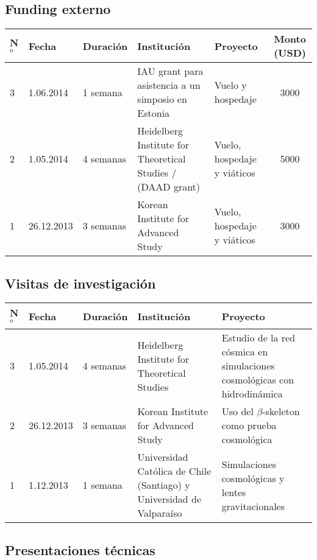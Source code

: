 \documentclass{article}
\begin{document}
\subsection{Funding externo}
\begin{tabular}{l l l p{3.5cm} p{2.3cm} c}\hline
N$^{o}$ & Fecha & Duraci\'on & Instituci\'on & Proyecto & Monto (USD)\\\hline
3 & 1.06.2014 & 1 semana & IAU grant para asistencia a un simposio en
Estonia & Vuelo y hospedaje & 3000\\\hline
2 & 1.05.2014 & 4 semanas & Heidelberg Institute for Theoretical
Studies / (DAAD grant) & Vuelo, hospedaje y vi\'aticos & 5000\\\hline
1 & 26.12.2013 & 3 semanas & Korean Institute for Advanced Study &
Vuelo, hospedaje y vi\'aticos & 3000\\\hline
\end{tabular}

\subsection{Visitas de investigaci\'on}

\begin{tabular}{l l l p{3.5cm} p{5.0cm}}\hline
N$^{o}$ & Fecha & Duraci\'on & Instituci\'on & Proyecto \\\hline
3 & 1.05.2014 & 4 semanas & Heidelberg Institute for Theoretical
Studies & Estudio de la red c\'osmica en simulaciones cosmol\'ogicas con hidrodin\'amica \\\hline
2 & 26.12.2013 & 3 semanas & Korean Institute for Advanced Study &
Uso del $\beta$-skeleton como prueba cosmol\'ogica\\\hline
1 & 1.12.2013 & 1 semana & Universidad Cat\'olica de Chile (Santiago) y Universidad de Valpara\'iso & Simulaciones cosmol\'ogicas y lentes gravitacionales\\\hline

\end{tabular}

\subsection{Presentaciones t\'ecnicas}
\end{document}
